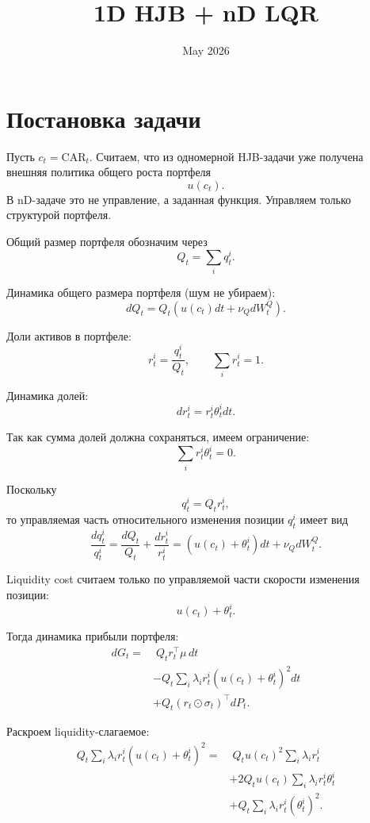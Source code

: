\documentclass[12pt,a4paper]{article}
\title{1D HJB + nD LQR}
\date{May 2026}
\begin{document}
\maketitle

\section{Постановка задачи}

Пусть $c_t=\mathrm{CAR}_t$. Считаем, что из одномерной HJB-задачи уже получена внешняя политика общего роста портфеля
\[
    u(c_t).
\]
В nD-задаче это не управление, а заданная функция. Управляем только структурой портфеля.

Общий размер портфеля обозначим через
\[
    Q_t = \sum_i q_t^i.
\]

Динамика общего размера портфеля (шум не убираем):
\[
    dQ_t = Q_t\left(u(c_t)dt + \nu_Q dW_t^Q\right).
\]

Доли активов в портфеле:
\[
    r_t^i = \frac{q_t^i}{Q_t},
    \qquad
    \sum_i r_t^i = 1.
\]

Динамика долей:
\[
    dr_t^i = r_t^i \theta_t^i dt.
\]

Так как сумма долей должна сохраняться, имеем ограничение:
\[
    \sum_i r_t^i \theta_t^i = 0.
\]

Поскольку
\[
    q_t^i = Q_t r_t^i,
\]
то управляемая часть относительного изменения позиции $q_t^i$ имеет вид
\[
    \frac{dq_t^i}{q_t^i}
    =
    \frac{dQ_t}{Q_t}
    +
    \frac{dr_t^i}{r_t^i}
    =
    \left(u(c_t)+\theta_t^i\right)dt
    + \nu_Q dW_t^Q.
\]

Liquidity cost считаем только по управляемой части скорости изменения позиции:
\[
    u(c_t)+\theta_t^i.
\]

Тогда динамика прибыли портфеля:
\[
\begin{aligned}
    dG_t
    =
    &\; Q_t r_t^\top \mu \, dt \\
    &- Q_t \sum_i \lambda_i r_t^i
        \left(u(c_t)+\theta_t^i\right)^2 dt \\
    &+ Q_t (r_t \odot \sigma_t)^\top dP_t.
\end{aligned}
\]

Раскроем liquidity-слагаемое:
\[
\begin{aligned}
    Q_t \sum_i \lambda_i r_t^i
        \left(u(c_t)+\theta_t^i\right)^2
    =
    &\; Q_t u(c_t)^2 \sum_i \lambda_i r_t^i \\
    &+ 2Q_t u(c_t) \sum_i \lambda_i r_t^i\theta_t^i \\
    &+ Q_t \sum_i \lambda_i r_t^i(\theta_t^i)^2.
\end{aligned}
\]
\end{document}
